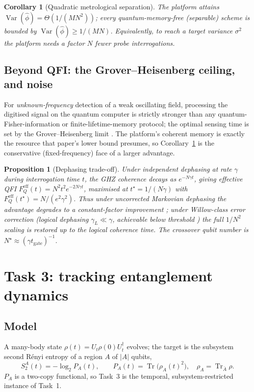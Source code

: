 \documentclass[11pt]{article}
\theoremstyle{plain}
\newtheorem{proposition}[theorem]{Proposition}
\newtheorem{corollary}[theorem]{Corollary}
\theoremstyle{definition}
\theoremstyle{remark}
\newcommand{\Tr}{\operatorname{Tr}}
\newcommand{\Var}{\operatorname{Var}}
\newcommand{\FQ}{F_{Q}}
\begin{document}
\begin{corollary}[Quadratic metrological separation]\label{cor:t2}
The platform attains $\Var(\widehat\phi)=\Theta(1/(MN^2))$; every quantum-memory-free (separable) scheme is bounded by $\Var(\widehat\phi)\ge 1/(MN)$. Equivalently, to reach a target variance $\sigma^2$ the platform needs a factor $N$ fewer probe interrogations.
\end{corollary}

\subsection{Beyond QFI: the Grover--Heisenberg ceiling, and noise}
For \emph{unknown-frequency} detection of a weak oscillating field, processing the digitised signal on the quantum computer is strictly stronger than any quantum-Fisher-information or finite-lifetime-memory protocol; the optimal sensing time is set by the Grover--Heisenberg limit \cite{QCES}. The platform's coherent memory is exactly the resource that paper's lower bound presumes, so Corollary~\ref{cor:t2} is the conservative (fixed-frequency) face of a larger advantage.

\begin{proposition}[Dephasing trade-off]\label{prop:t2noise}
Under independent dephasing at rate $\gamma$ during interrogation time $t$, the GHZ coherence decays as $e^{-N\gamma t}$, giving effective QFI $\FQ^{\mathrm{eff}}(t)=N^2 t^2 e^{-2N\gamma t}$, maximised at $t^\star=1/(N\gamma)$ with $\FQ^{\mathrm{eff}}(t^\star)=N/(e^2\gamma^2)$. Thus under uncorrected Markovian dephasing the advantage degrades to a \emph{constant-factor} improvement \cite{Huelga}; under Willow-class error correction (logical dephasing $\gamma_L\ll\gamma$, achievable below threshold \cite{Willow}) the full $1/N^2$ scaling is restored up to the logical coherence time. The crossover qubit number is $N^\star\approx (\gamma t_{\mathrm{gate}})^{-1}$.
\end{proposition}

\section{Task 3: tracking entanglement dynamics}\label{sec:task3}

\subsection{Model}
A many-body state $\rho(t)=U_t\rho(0)U_t^\dagger$ evolves; the target is the subsystem second R\'enyi entropy of a region $A$ of $|A|$ qubits,
\begin{equation}
S_2^A(t)=-\log_2 P_A(t),\qquad P_A(t)=\Tr\!\big(\rho_A(t)^2\big),\quad \rho_A=\Tr_{\bar A}\rho .
\end{equation}
$P_A$ is a two-copy functional, so Task~3 is the temporal, subsystem-restricted instance of Task~1.
\end{document}
